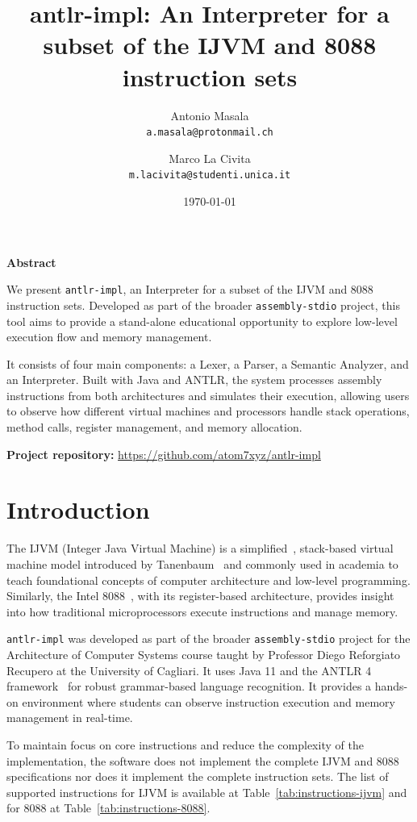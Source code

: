 \documentclass[11pt]{article}
\title{\textbf{antlr-impl: An Interpreter for a subset of the IJVM and 8088 instruction sets}}
\author{
  Antonio Masala \\
  \texttt{a.masala@protonmail.ch} \\
  \and
  Marco La Civita \\
  \texttt{m.lacivita@studenti.unica.it}
}
\date{\today}
\renewcommand{\abstractname}{\normalfont\bfseries Abstract}
\renewenvironment{abstract}{
    \begin{flushleft}
    \normalfont\bfseries \abstractname\vspace{0.5em}\par
    \normalfont
}{
    \end{flushleft}
}
\begin{document}
\maketitle

\begin{abstract}
\raggedright
We present \texttt{antlr-impl}, an Interpreter for a subset of the IJVM and 8088 instruction sets. Developed as part of the broader \texttt{assembly-stdio} project, this tool aims to provide a stand-alone educational opportunity to explore low-level execution flow and memory management.

It consists of four main components: a Lexer, a Parser, a Semantic Analyzer, and an Interpreter. Built with Java and ANTLR, the system processes assembly instructions from both architectures and simulates their execution, allowing users to observe how different virtual machines and processors handle stack operations, method calls, register management, and memory allocation.
\vspace{2em}
\noindent

\textbf{Project repository:} \url{https://github.com/atom7xyz/antlr-impl}
\end{abstract}

\newpage

\section{Introduction}
The IJVM (Integer Java Virtual Machine) is a simplified~\cite{ijvm_wiki}, stack-based virtual machine model introduced by Tanenbaum~\cite{tanenbaum2013} and commonly used in academia to teach foundational concepts of computer architecture and low-level programming. Similarly, the Intel 8088~\cite{intel8088_wiki}, with its register-based architecture, provides insight into how traditional microprocessors execute instructions and manage memory.

\texttt{antlr-impl} was developed as part of the broader \texttt{assembly-stdio} project for the Architecture of Computer Systems course taught by Professor Diego Reforgiato Recupero at the University of Cagliari. It uses Java 11 and the ANTLR 4 framework~\cite{antlr_website} for robust grammar-based language recognition. It provides a hands-on environment where students can observe instruction execution and memory management in real-time.

To maintain focus on core instructions and reduce the complexity of the implementation, the software does not implement the complete IJVM and 8088 specifications nor does it implement the complete instruction sets. The list of supported instructions for IJVM is available at Table~\ref{tab:instructions-ijvm} and for 8088 at Table~\ref{tab:instructions-8088}.
\end{document}
